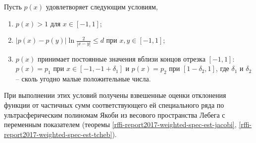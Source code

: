 Пусть $p(x)$ удовлетворяет следующим условиям,
\begin{enumerate}[1)]
\item
$p(x)>1$ для $x\in[-1,1]$;
\item
$|p(x)-p(y)|\ln\frac{2}{|x-y|}\le d$ при $x,y\in[-1,1]$;
\item
$p(x)$  принимает постоянные значения вблизи концов отрезка $[-1,1]$: $p(x)=p_1$ при $x\in[-1,-1+\delta_1]$ и $p(x)=p_2$ при $[1-\delta_2, 1]$, где $\delta_1$ и $\delta_2$ -- сколь угодно малые положительные числа.
\end{enumerate}
При выполнении этих условий получены взвешенные оценки отклонения функции от частичных сумм соответствующего ей специального ряда по ультрасферическим полиномам Якоби из весового пространства Лебега с переменным показателем (теоремы \ref{rffi-report2017-weighted-spec-est-jacobi}, \ref{rffi-report2017-weighted-spec-est-tcheb}).




